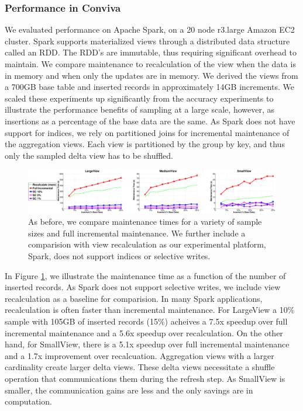 \subsubsection{Performance in Conviva}
We evaluated performance on Apache Spark, on a 20 node r3.large Amazon EC2 cluster. 
Spark supports materialized views through a distributed data structure called an RDD.
The RDD's are immutable, thus requiring significant overhead to maintain.
We compare maintenance to recalculation of the view when the data is in memory and when only the updates are in memory. 
We derived the views from a 700GB base table and inserted records in approximately 14GB increments. 
We scaled these experiments up significantly from the accuracy experiments to illustrate the performance benefits of sampling at a large scale, however, as insertions as a percentage of the base data are the same.
As Spark does not have support for indices, we rely on partitioned joins for incremental maintenance of the aggregation views.
Each view is partitioned by the group by key, and thus only the sampled delta view has to be shuffled. 

\begin{figure}[ht!]
\label{exp6conviva}
\hspace{-1em}
\includegraphics[scale=0.21]{exp/exp5-efficiency-conviva.eps}
 \caption{As before, we compare maintenance times for a variety of sample sizes and full incremental maintenance. We further include a comparision with view recalculation as our experimental platform, Spark, does not support indices or selective writes.}
\end{figure}

In Figure \ref{exp6conviva}, we illustrate the maintenance time as a function of the number of inserted records.
As Spark does not support selective writes, we include view recalculation as a baseline for comparision.
In many Spark applications, recalculation is often faster than incremental maintenance.
For LargeView a 10\% sample with 105GB of inserted records (15\%) acheives a  7.5x speedup over full incremental maintenance and a 5.6x speedup over recalculation.
On the other hand, for SmallView, there is a 5.1x speedup over full incremental maintenance and a 1.7x improvement over recalcuation.
Aggregation views with a larger cardinality create larger delta views.
These delta views necessitate a shuffle operation that communications them during the refresh step.
As SmallView is smaller, the communication gains are less and the only savings are in computation.



